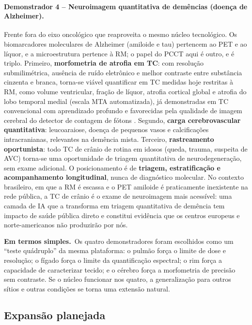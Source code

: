 \documentclass[11pt,a4paper]{article}
\newcommand{\simples}{\textcolor{titleblue}{\textbf{Em termos simples.}}\ }
\begin{document}
\paragraph{Demonstrador 4 -- Neuroimagem quantitativa de demências (doença de Alzheimer).} Frente fora do eixo oncológico que reaproveita o mesmo núcleo tecnológico. Os biomarcadores moleculares de Alzheimer (amiloide e tau) pertencem ao PET e ao líquor, e a microestrutura pertence à RM; o papel do PCCT aqui é outro, e é triplo. Primeiro, \textbf{morfometria de atrofia em TC}: com resolução submilimétrica, ausência de ruído eletrônico e melhor contraste entre substância cinzenta e branca, torna-se viável quantificar em TC medidas hoje restritas à RM, como volume ventricular, fração de líquor, atrofia cortical global e atrofia do lobo temporal medial (escala MTA automatizada), já demonstradas em TC convencional com aprendizado profundo \cite{srikrishna2021,srikrishna2024} e favorecidas pela qualidade de imagem cerebral do detector de contagem de fótons \cite{pourmorteza}. Segundo, \textbf{carga cerebrovascular quantitativa}: leucoaraiose, doença de pequenos vasos e calcificações intracranianas, relevantes na demência mista. Terceiro, \textbf{rastreamento oportunista}: todo TC de crânio de rotina em idosos (queda, trauma, suspeita de AVC) torna-se uma oportunidade de triagem quantitativa de neurodegeneração, sem exame adicional. O posicionamento é de \textbf{triagem, estratificação e acompanhamento longitudinal}, nunca de diagnóstico molecular. No contexto brasileiro, em que a RM é escassa e o PET amiloide é praticamente inexistente na rede pública, a TC de crânio é o exame de neuroimagem mais acessível: uma camada de IA que a transforma em triagem quantitativa de demência tem impacto de saúde pública direto e constitui evidência que os centros europeus e norte-americanos não produzirão por nós.

\begin{caixa}
\simples Os quatro demonstradores foram escolhidos como um ``teste quádruplo'' da mesma plataforma: o pulmão força o limite de dose e resolução; o fígado força o limite da quantificação espectral; o rim força a capacidade de caracterizar tecido; e o cérebro força a morfometria de precisão sem contraste. Se o núcleo funcionar nos quatro, a generalização para outros sítios e outras condições se torna uma extensão natural.
\end{caixa}

\subsection{Expansão planejada}
\end{document}
